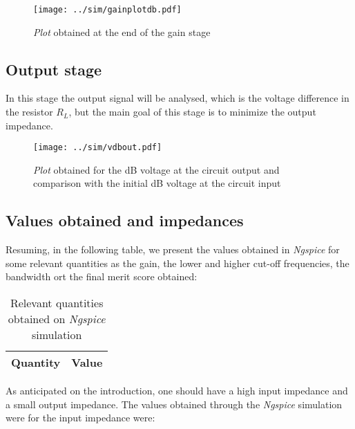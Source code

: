 \vspace{-70px}
\begin{figure}[H]
    \centering
    \vspace{-50px}
    \texttt{[image: ../sim/gainplotdb.pdf]}
    \vspace{-30px}
    \caption{\textit{Plot} obtained at the end of the gain stage}
    \label{fig:gaindb}
\end{figure}

\subsection{Output stage}
In this stage the output signal will be analysed, which is the voltage difference in the resistor $R_L$, but the main goal of this stage is to minimize the output impedance.

\vspace{-70px}
\begin{figure}[H]
    \centering
    \vspace{-50px}
    \texttt{[image: ../sim/vdbout.pdf]}
    \vspace{-30px}
    \caption{\textit{Plot} obtained for the dB voltage at the circuit output and comparison with the initial dB voltage at the circuit input}
    \label{fig:output}
\end{figure}

\subsection{Values obtained and impedances}
Resuming, in the following table, we present the values obtained in \textit{Ngspice} for some relevant quantities as the gain, the lower and higher cut-off frequencies, the bandwidth ort the final merit score obtained:

\begin{table}[H]
    \centering
    \begin{tabular}{c|c}
        \textbf{Quantity} & \textbf{Value}\\
        \hline
        \hline
        
    \end{tabular}
    \caption{Relevant quantities obtained on \textit{Ngspice} simulation}
    \label{tab:quantities}
\end{table}

As anticipated on the introduction, one should have a high input impedance and a small output impedance. The values obtained through the \textit{Ngspice} simulation were for the input impedance were:

